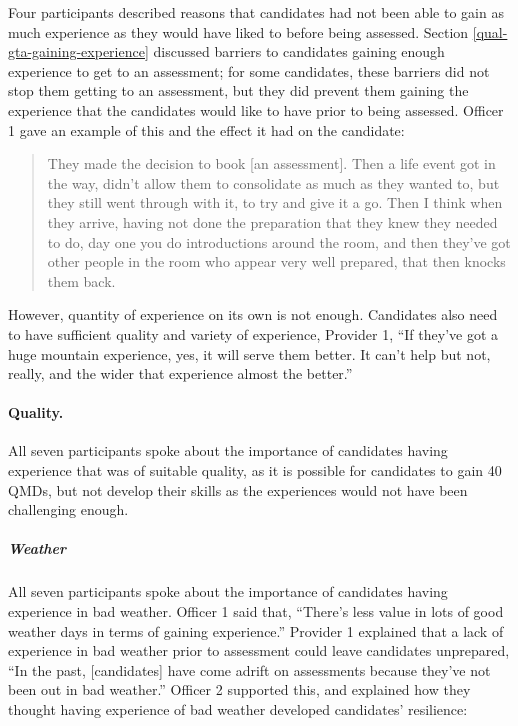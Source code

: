 \documentclass[
  12pt,
  a4paper,
]{book}
\begin{document}
Four participants described reasons that candidates had not been able to gain as much experience as they would have liked to before being assessed. Section \ref{qual-gta-gaining-experience} discussed barriers to candidates gaining enough experience to get to an assessment; for some candidates, these barriers did not stop them getting to an assessment, but they did prevent them gaining the experience that the candidates would like to have prior to being assessed. Officer 1 gave an example of this and the effect it had on the candidate:

\begin{quote}
They made the decision to book {[}an assessment{]}. Then a life event got in the way, didn't allow them to consolidate as much as they wanted to, but they still went through with it, to try and give it a go. Then I think when they arrive, having not done the preparation that they knew they needed to do, day one you do introductions around the room, and then they've got other people in the room who appear very well prepared, that then knocks them back.
\end{quote}

However, quantity of experience on its own is not enough. Candidates also need to have sufficient quality and variety of experience, Provider 1, ``If they've got a huge mountain experience, yes, it will serve them better. It can't help but not, really, and the wider that experience almost the better.''

\hypertarget{quality.}{%
\paragraph{Quality.}\label{quality.}}

All seven participants spoke about the importance of candidates having experience that was of suitable quality, as it is possible for candidates to gain 40 QMDs, but not develop their skills as the experiences would not have been challenging enough.

\hypertarget{weather}{%
\subparagraph{Weather}\label{weather}}

All seven participants spoke about the importance of candidates having experience in bad weather. Officer 1 said that, ``There's less value in lots of good weather days in terms of gaining experience.'' Provider 1 explained that a lack of experience in bad weather prior to assessment could leave candidates unprepared, ``In the past, {[}candidates{]} have come adrift on assessments because they've not been out in bad weather.'' Officer 2 supported this, and explained how they thought having experience of bad weather developed candidates' resilience:
\end{document}

